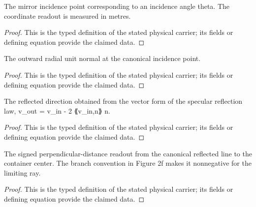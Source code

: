 \begin{definition}
  \label{def:physics:IPhO_2026_2_B_1:aux014}
  The mirror incidence point corresponding to an incidence angle theta. The coordinate readout is measured in metres.
\end{definition}
\begin{proof}
  This is the typed definition of the stated physical carrier; its fields or defining equation provide the claimed data.
\end{proof}

\begin{definition}
  \label{def:physics:IPhO_2026_2_B_1:aux015}
  The outward radial unit normal at the canonical incidence point.
\end{definition}
\begin{proof}
  This is the typed definition of the stated physical carrier; its fields or defining equation provide the claimed data.
\end{proof}

\begin{definition}
  \label{def:physics:IPhO_2026_2_B_1:aux016}
  The reflected direction obtained from the vector form of the specular reflection law, v\_out = v\_in - 2 ⟪v\_in,n⟫ n.
\end{definition}
\begin{proof}
  This is the typed definition of the stated physical carrier; its fields or defining equation provide the claimed data.
\end{proof}

\begin{definition}
  \label{def:physics:IPhO_2026_2_B_1:aux017}
  The signed perpendicular-distance readout from the canonical reflected line to the container center. The branch convention in Figure 2f makes it nonnegative for the limiting ray.
\end{definition}
\begin{proof}
  This is the typed definition of the stated physical carrier; its fields or defining equation provide the claimed data.
\end{proof}

